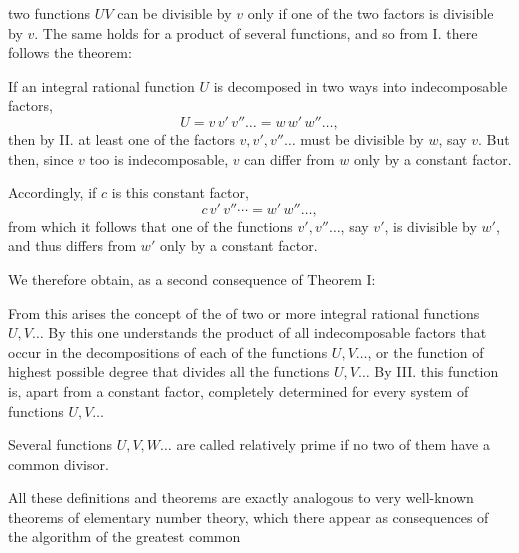 
two functions $UV$ can be divisible by $v$ only if one of the two
factors is divisible by $v$. The same holds for a product of
several functions, and so from I. there follows the theorem:


If an integral rational function $U$ is decomposed in two
ways into indecomposable factors,
\[
U = v\,v'\,v''\dots = w\,w'\,w''\dots,
\]
then by II. at least one of the factors $v, v', v''\dots$ must be
divisible by $w$, say $v$. But then, since $v$ too is indecomposable,
$v$ can differ from $w$ only by a constant factor.

Accordingly, if $c$ is this constant factor,
\[
c\,v'\,v''\cdots = w'\,w''\dots,
\]
from which it follows that one of the functions $v', v''\dots$, say $v'$,
is divisible by $w'$, and thus differs from $w'$ only by a constant
factor.

We therefore obtain, as a second consequence of Theorem I:


From this arises the concept of the  of two or more integral rational functions
$U, V\dots$ By this one understands the product of all
indecomposable factors that occur in the decompositions of each of the
functions $U, V\dots$, or the function of highest possible
degree that divides all the functions $U, V\dots$ By III. this
function is, apart from a constant factor, completely determined
for every system of functions $U, V\dots$

Several functions $U, V, W\dots$ are called relatively prime if
no two of them have a common divisor.

All these definitions and theorems are exactly analogous to
very well-known theorems of elementary number theory, which there
appear as consequences of the algorithm of the greatest common
